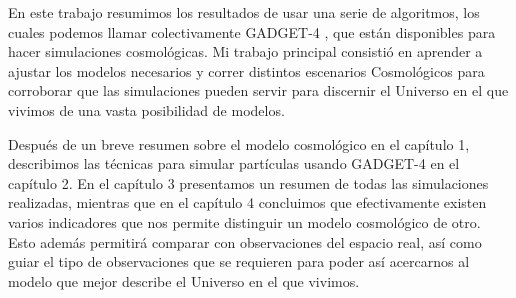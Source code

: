 En este trabajo resumimos los resultados de usar una serie de algoritmos, los cuales  podemos llamar colectivamente {\blues GADGET-4 \cite{2001NewA....6...79S,2021MNRAS.506.2871S}}, que están disponibles para hacer simulaciones cosmológicas. Mi trabajo principal consistió en aprender a ajustar los modelos necesarios y correr distintos escenarios Cosmológicos para corroborar que las simulaciones pueden servir para discernir el Universo en el que vivimos de una vasta posibilidad de modelos.

Después de un breve resumen sobre el modelo cosmológico en el capítulo 1, describimos las técnicas para simular partículas usando {\blues GADGET-4} en el capítulo 2. En el capítulo 3 presentamos un resumen de todas las simulaciones realizadas, mientras que en el capítulo 4 concluimos que efectivamente existen varios indicadores que nos permite distinguir un modelo cosmológico de otro. Esto además permitirá comparar con observaciones del espacio real, así como guiar el tipo de observaciones que se requieren para poder así acercarnos al modelo que mejor describe el Universo en el que vivimos.









\lhead[\fancyplain{}{}]%
      {\fancyplain{}{\bfseries\rightmark}}

